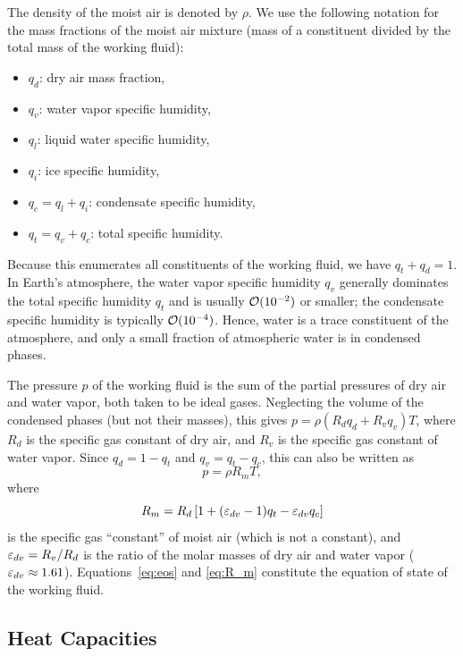 \documentclass{report}
\begin{document}
The density of the moist air is denoted by $\rho$. We use the following notation for the mass fractions of the moist air mixture (mass of a constituent divided by the total mass of the working fluid):
\begin{itemize}
\item $q_d$: dry air mass fraction,
\item $q_v$: water vapor specific humidity,
\item $q_l$: liquid water specific humidity,
\item $q_i$: ice specific humidity,
\item $q_c = q_l + q_i$: condensate specific humidity,
\item $q_t = q_v + q_c$: total specific humidity.
\end{itemize}
Because this enumerates all constituents of the working fluid, we have $q_t + q_d = 1$. In Earth's atmosphere, the water vapor specific humidity $q_v$ generally dominates the total specific humidity $q_t$ and is usually $\mathcal{O}(10^{-2})$ or smaller; the condensate specific humidity is typically $\mathcal{O}(10^{-4})$. Hence, water is a trace constituent of the atmosphere, and only a small fraction of atmospheric water is in condensed phases. 

The pressure $p$ of the working fluid is the sum of the partial pressures of dry air and water vapor, both taken to be ideal gases. Neglecting the volume of the condensed phases (but not their masses), this gives $p = \rho (R_d q_d + R_v q_v) T$, where $R_d$ is the specific gas constant of dry air, and $R_v$ is the specific gas constant of water vapor. Since $q_d = 1-q_t$ and $q_v = q_t - q_c$, this can also be written as
\begin{equation}
    p = \rho R_m T,
\label{eq:eos}
\end{equation}
where
\begin{equation}
    R_m = R_d \left[1 + (\varepsilon_{dv}-1)q_t - \varepsilon_{dv} q_c\right]
\label{eq:R_m}
\end{equation}
is the specific gas ``constant'' of moist air (which is not a constant), and $\varepsilon_{dv} = R_v/R_d$ is the ratio of the molar masses of dry air and water vapor ($\varepsilon_{dv} \approx 1.61$). Equations~\eqref{eq:eos} and \eqref{eq:R_m} constitute the equation of state of the working fluid.

\subsection{Heat Capacities}\label{s:heat_capacities}
\end{document}
